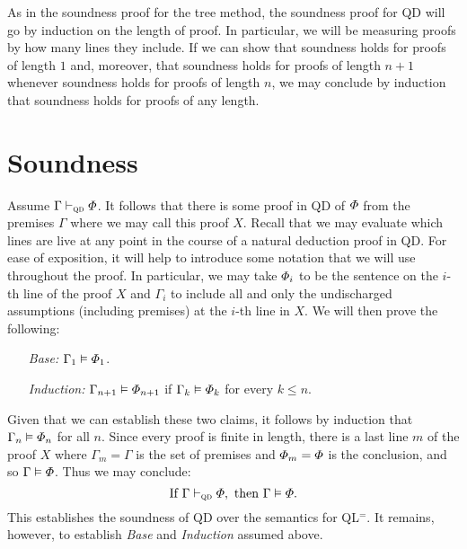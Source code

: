 As in the soundness proof for the tree method, the soundness proof for QD will go by induction on the length of proof.
In particular, we will be measuring proofs by how many lines they include.
If we can show that soundness holds for proofs of length $1$ and, moreover, that soundness holds for proofs of length $n+1$ whenever soundness holds for proofs of length $n$, we may conclude by induction that soundness holds for proofs of any length.




\section{Soundness}%
  \label{sec:Soundness}

Assume $\Gamma \vdash_{\textsc{qd}} \varPhi$.
It follows that there is some proof in QD of $\varPhi$ from the premises $\Gamma$ where we may call this proof $X$. 
Recall that we may evaluate which lines are live at any point in the course of a natural deduction proof in QD.
For ease of exposition, it will help to introduce some notation that we will use throughout the proof.
In particular, we may take $\varPhi_i$ to be the sentence on the $i$-th line of the proof $X$ and $\Gamma_i$ to include all and only the undischarged assumptions (including premises) at the $i$-th line in $X$.
We will then prove the following:
\begin{enumerate}[leftmargin=1.5in]
  \item[\it Base:] $\Gamma_1 \vDash \varPhi_1$.
  \item[\it Induction:] $\Gamma_{n+1} \vDash \varPhi_{n+1}$ if $\Gamma_k \vDash \varPhi_k$ for every $k\leq n$.
\end{enumerate}
Given that we can establish these two claims, it follows by induction that $\Gamma_n \vDash \varPhi_n$ for all $n$.
Since every proof is finite in length, there is a last line $m$ of the proof $X$ where $\Gamma_m=\Gamma$ is the set of premises and $\varPhi_m=\varPhi$ is the conclusion, and so $\Gamma \vDash \varPhi$. 
Thus we may conclude:
  $$\text{If } \Gamma \vdash_{\textsc{qd}} \varPhi, \text{ then } \Gamma \vDash \varPhi.$$
This establishes the soundness of QD over the semantics for QL$^=$.
It remains, however, to establish \textit{Base} and \textit{Induction} assumed above.

